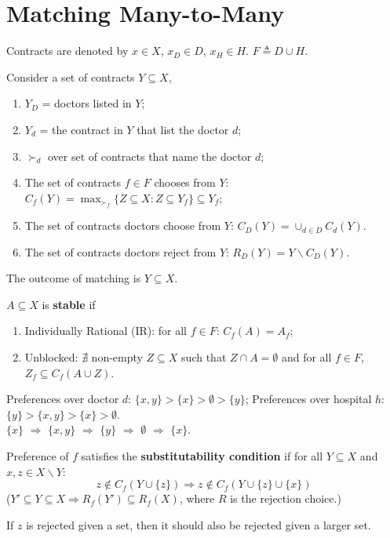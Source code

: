 \documentclass[11pt]{elegantbook}
\begin{document}
\section{Matching Many-to-Many}
Contracts are denoted by $x\in X$, $x_D\in D$, $x_H\in H$. $F\triangleq D\cup H$.

Consider a set of contracts $Y\subseteq X$,
\begin{enumerate}[$\circ$]
    \item $Y_D$ = doctors listed in $Y$;
    \item $Y_d$ = the contract in $Y$ that list the doctor $d$;
    \item $\succ_d$ over set of contracts that name the doctor $d$;
    \item The set of contracts $f\in F$ chooses from $Y$: $C_f(Y)=\max_{\succ_f}\{Z\subseteq X:Z\subseteq Y_f\}\subseteq Y_f$;
    \item The set of contracts doctors choose from $Y$: $C_D(Y)=\cup_{d\in D}C_d(Y)$.
    \item The set of contracts doctors reject from $Y$: $R_D(Y)=Y\backslash C_D(Y)$.
\end{enumerate}
The outcome of matching is $Y\subseteq X$.

\begin{definition}
    \normalfont
    $A\subseteq X$ is \textbf{stable} if
    \begin{enumerate}[$\circ$]
        \item Individually Rational (IR): for all $f\in F$: $C_f(A)=A_f$;
        \item Unblocked: $\nexists$ non-empty $Z\subseteq X$ such that $Z\cap A=\emptyset $ and for all $f\in F$, $Z_f\subseteq C_f(A\cup Z)$.
    \end{enumerate}
\end{definition}

\begin{example}
    Preferences over doctor $d$: $\{x,y\}>\{x\}>\emptyset>\{y\}$; Preferences over hospital $h$: $\{y\}>\{x,y\}>\{x\}>\emptyset$.\\
    $\{x\}$ $\Rightarrow$ $\{x,y\}$ $\Rightarrow$ $\{y\}$ $\Rightarrow$ $\emptyset$ $\Rightarrow$ $\{x\}$.
\end{example}

\begin{definition}
    \normalfont
    Preference of $f$ satisfies the \textbf{substitutability condition} if for all $Y\subseteq X$ and $x,z\in X\backslash Y$:
    $$z\notin C_f(Y\cup\{z\}) \Rightarrow z\notin C_f(Y\cup\{z\}\cup\{x\})$$
    ($Y'\subseteq Y\subseteq X \Rightarrow R_f(Y')\subseteq R_f(X)$, where $R$ is the rejection choice.)
\end{definition}
If $z$ is rejected given a set, then it should also be rejected given a larger set.
\end{document}
